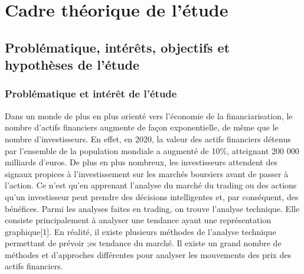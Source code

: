 	
\section{Cadre théorique de l'étude}

\subsection{Problématique, intérêts, objectifs et hypothèses de l'étude}

\subsubsection{Problématique et intérêt de l'étude}
\par{
	Dans un monde de plus en plus orienté vers l'économie de la financiarisation, 
le nombre d'actifs financiers augmente de façon exponentielle, de même que le
nombre d'investisseurs. En effet, en 2020, la valeur des actifs financiers détenus 
par l'ensemble de la population mondiale a augmenté de 10\%, atteignant 200 000
milliards d'euros. De plus en plus nombreux, les investisseurs attendent des signaux 
propices à l'investissement sur les marchés boursiers avant de passer à l'action. 
Ce n'est qu'en apprenant l'analyse du marché du trading ou des actions qu'un investisseur 
peut prendre des décisions intelligentes et, par conséquent, des bénéfices. Parmi les 
analyses faites en trading, on trouve l'analyse technique. Elle consiste principalement à 
analyser une tendance ayant une représentation graphique[1].
En réalité, il existe plusieurs méthodes de l'analyse technique permettant de prévoir 
;es tendance du marché. Il existe  un grand nombre de méthodes et d'approches différentes 
pour analyser les mouvements des prix  des actifs financiers. 

}
